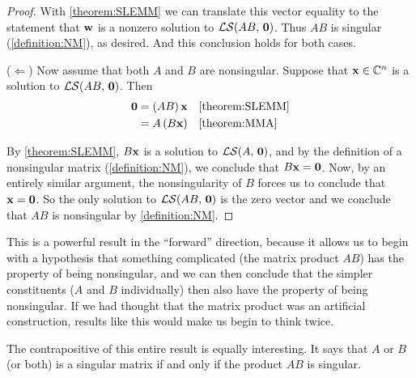 \documentclass{ximera}
\begin{document}
\begin{theorem}
\begin{proof}
    With \ref{theorem:SLEMM} we can translate this vector equality to
    the statement that $\mathbf{w}$ is a nonzero solution to
    $\mathcal{LS}\!\left(AB,\,\mathbf{0}\right)$.  Thus $AB$ is singular (\ref{definition:NM}),
    as desired.  And this conclusion holds for both cases.

    ($\Leftarrow$) Now assume that both $A$ and $B$ are nonsingular.
    Suppose that $\mathbf{x}\in\mathbb{C}^{n}$ is a solution to
    $\mathcal{LS}\!\left(AB,\,\mathbf{0}\right)$.  Then
    \begin{align*}
      \mathbf{0}
      &=\left(AB\right)\mathbf{x}&&\ref{theorem:SLEMM}\\
      &=A\left(B\mathbf{x}\right)&&\ref{theorem:MMA}
    \end{align*}

    By \ref{theorem:SLEMM}, $B\mathbf{x}$ is a solution to
    $\mathcal{LS}\!\left(A,\,\mathbf{0}\right)$, and by the definition of a nonsingular matrix
    (\ref{definition:NM}), we conclude that $B\mathbf{x}=\mathbf{0}$.
    Now, by an entirely similar argument, the nonsingularity of $B$
    forces us to conclude that $\mathbf{x}=\mathbf{0}$.  So the only
    solution to $\mathcal{LS}\!\left(AB,\,\mathbf{0}\right)$ is the zero vector and we conclude
    that $AB$ is nonsingular by \ref{definition:NM}.
  \end{proof}
\end{theorem}

This is a powerful result in the ``forward'' direction, because it
allows us to begin with a hypothesis that something complicated (the
matrix product $AB$) has the property of being nonsingular, and we can
then conclude that the simpler constituents ($A$ and $B$ individually)
then also have the property of being nonsingular.  If we had thought
that the matrix product was an artificial construction, results like
this would make us begin to think twice.

The contrapositive of this entire result is equally interesting.  It
says that $A$ or $B$ (or both) is a singular matrix if and only if the
product $AB$ is singular.
\end{document}
